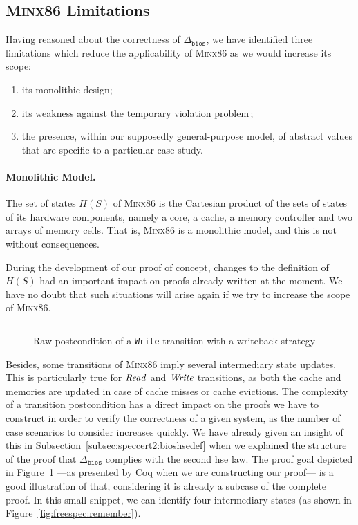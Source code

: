 \subsection{{\scshape Minx86} Limitations}
\label{subsec:freespec:minx86lim}

Having reasoned about the correctness of \( \Delta_{\mathtt{bios}} \), we have
identified three limitations which reduce the applicability of {\scshape Minx86}
as we would increase its scope:
\begin{enumerate}
\item its monolithic design;
\item  its weakness against the temporary violation problem\,\cite{muller2006tempviolation};
\item the presence, within our supposedly general-purpose model, of abstract values that are specific to a particular case study.
\end{enumerate}

\paragraph{Monolithic Model.}
%
The set of states \( H(S) \) of {\scshape Minx86} is the Cartesian product of
the sets of states of its hardware components, namely a core, a cache, a memory
controller and two arrays of memory cells.
%
That is, {\scshape Minx86} is a monolithic model, and this is not without
consequences.

During the development of our proof of concept, changes to the definition of
\( H(S) \) had an important impact on proofs already written at the moment.
%
We have no doubt that such situations will arise again if we try to increase the
scope of {\scshape Minx86}.

\begin{figure}
  \inputminted{coq}{Listings/StateHell.v}

  \caption{Raw postcondition of a \texttt{Write} transition with a writeback
    strategy}
  \label{fig:freespec:entrypoint}
\end{figure}

Besides, some transitions of {\scshape Minx86} imply several intermediary state
updates.
%
This is particularly true for \( \mathit{Read} \) and \( \mathit{Write} \)
transitions, as both the cache and memories are updated in case of cache misses
or cache evictions.
%
The complexity of a transition postcondition has a direct impact on the proofs
we have to construct in order to verify the correctness of a given system, as
the number of case scenarios to consider increases quickly.
%
We have already given an insight of this in
Subsection~\ref{subsec:speccert2:bioshsedef} when we explained the structure of
the proof that \( \Delta_{\mathtt{bios}} \) complies with the second \ac{hse}
law.
%
The proof goal depicted in Figure~\ref{fig:freespec:entrypoint} ---as presented
by Coq when we are constructing our proof--- is a good illustration of that,
considering it is already a subcase of the complete proof.
%
In this small snippet, we can identify four intermediary states (as shown in
Figure~\ref{fig:freespec:remember}).

